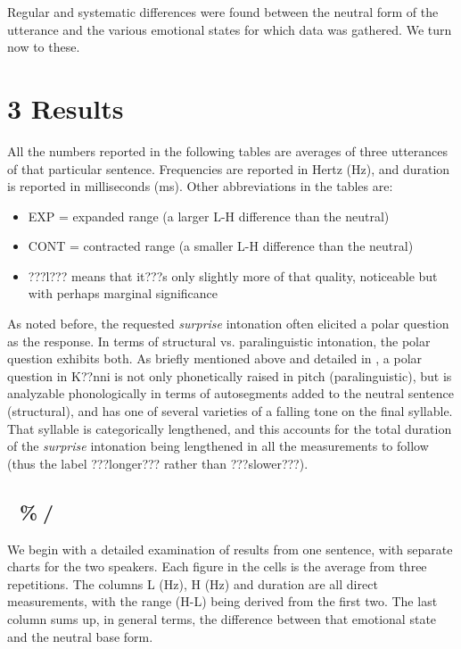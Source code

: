 \documentclass[output=paper]{langsci/langscibook}
\begin{document}
Regular and systematic differences were found between the neutral form of the utterance and the various emotional states for which data was gathered. We turn now to these. 

\chapter{3 Results }
\begin{styleBodyTextIndent}
All the numbers reported in the following tables are averages of three utterances of that particular sentence. Frequencies are reported in Hertz (Hz), and duration is reported in milliseconds (ms). Other abbreviations in the tables are: 
\end{styleBodyTextIndent}

\begin{itemize}
\item EXP = expanded range (a larger L-H difference than the neutral)
\item CONT = contracted range (a smaller L-H difference than the neutral)
\item ???l??? means that it???s only slightly more of that quality, noticeable but with perhaps marginal significance 
\end{itemize}

As noted before, the requested \emph{surprise} intonation often elicited a polar question as the response. In terms of structural vs. paralinguistic intonation, the polar question exhibits both. As briefly mentioned above and detailed in \citet{Cahill2012}, a polar question in K??nni is not only phonetically raised in pitch (paralinguistic), but is analyzable phonologically in terms of autosegments added to the neutral sentence (structural), and has one of several varieties of a falling tone on the final syllable. That syllable is categorically lengthened, and this accounts for the total duration of the \emph{surprise} intonation being lengthened in all the measurements to follow (thus the label ???longer??? rather than ???slower???).

\section{ \%/}
\begin{styleBodyTextIndent}
We begin with a detailed examination of results from one sentence, with separate charts for the two speakers. Each figure in the cells is the average from three repetitions. The columns L (Hz), H (Hz) and duration are all direct measurements, with the range (H-L) being derived from the first two. The last column sums up, in general terms, the difference between that emotional state and the neutral base form. 
\end{styleBodyTextIndent}
\end{document}
